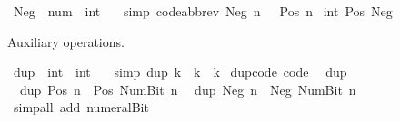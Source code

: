 \begin{isabellebody}
\ Neg\ {\isacharcolon}{\kern0pt}{\isacharcolon}{\kern0pt}\ {\isachardoublequoteopen}num\ {\isasymRightarrow}\ int{\isachardoublequoteclose}\isanewline
\ \ \ {\isacharbrackleft}{\kern0pt}simp{\isacharcomma}{\kern0pt}\ code{\isacharunderscore}{\kern0pt}abbrev{\isacharbrackright}{\kern0pt}{\isacharcolon}{\kern0pt}\ {\isachardoublequoteopen}Neg\ n\ {\isacharequal}{\kern0pt}\ {\isacharminus}{\kern0pt}\ {\isacharparenleft}{\kern0pt}Pos\ n{\isacharparenright}{\kern0pt}{\isachardoublequoteclose}\isanewline
\isanewline
{}\isamarkupfalse%
\ {\isachardoublequoteopen}{}{\isacharcolon}{\kern0pt}{\isacharcolon}{\kern0pt}int{\isachardoublequoteclose}\ Pos\ Neg%
\begin{isamarkuptext}%
Auxiliary operations.%
\end{isamarkuptext}\isamarkuptrue%
\isamarkupfalse%
\ dup\ {\isacharcolon}{\kern0pt}{\isacharcolon}{\kern0pt}\ {\isachardoublequoteopen}int\ {\isasymRightarrow}\ int{\isachardoublequoteclose}\isanewline
\ \ \ {\isacharbrackleft}{\kern0pt}simp{\isacharbrackright}{\kern0pt}{\isacharcolon}{\kern0pt}\ {\isachardoublequoteopen}dup\ k\ {\isacharequal}{\kern0pt}\ k\ {\isacharplus}{\kern0pt}\ k{\isachardoublequoteclose}\isanewline
\isanewline
{}\isamarkupfalse%
\ dup{\isacharunderscore}{\kern0pt}code\ {\isacharbrackleft}{\kern0pt}code{\isacharbrackright}{\kern0pt}{\isacharcolon}{\kern0pt}\isanewline
\ \ {\isachardoublequoteopen}dup\ {}\ {\isacharequal}{\kern0pt}\ {}{\isachardoublequoteclose}\isanewline
\ \ {\isachardoublequoteopen}dup\ {\isacharparenleft}{\kern0pt}Pos\ n{\isacharparenright}{\kern0pt}\ {\isacharequal}{\kern0pt}\ Pos\ {\isacharparenleft}{\kern0pt}Num{\isachardot}{\kern0pt}Bit{}\ n{\isacharparenright}{\kern0pt}{\isachardoublequoteclose}\isanewline
\ \ {\isachardoublequoteopen}dup\ {\isacharparenleft}{\kern0pt}Neg\ n{\isacharparenright}{\kern0pt}\ {\isacharequal}{\kern0pt}\ Neg\ {\isacharparenleft}{\kern0pt}Num{\isachardot}{\kern0pt}Bit{}\ n{\isacharparenright}{\kern0pt}{\isachardoublequoteclose}\isanewline
%
\isadelimproof
\ \ %
\endisadelimproof
%
\isatagproof
{}\isamarkupfalse%
\ {\isacharparenleft}{\kern0pt}simp{\isacharunderscore}{\kern0pt}all\ add{\isacharcolon}{\kern0pt}\ numeral{\isacharunderscore}{\kern0pt}Bit{}{\isacharparenright}{\kern0pt}%
\endisatagproof
{\isafoldproof}%
%
\isadelimproof
\isanewline
%
\endisadelimproof
\isanewline
{}\isamarkupfalse%

\end{isabellebody}
